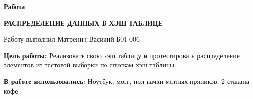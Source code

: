 

\shiftedText{0.5cm}{14cm}
{

    \begin{center}
    \vspace*{1.0cm}    
        
        {\bf\huge Работа \labnum }
        
    \vspace*{0.4cm}    
        
        {\bf\Large РАСПРЕДЕЛЕНИЕ ДАННЫХ В ХЭШ ТАБЛИЦЕ }
        
    \vspace*{0.8cm}
        
        {\Large Работу выполнил Матренин Василий Б01-006 }
        
    \vspace*{1.6cm}
    \end{center}
    
    {\bf\noindent Цель работы: }Реализовать свою хэш таблицу и протестировать распределение элементов из тестовой выборки по спискам хэш таблицы
    
    \vspace*{0.6cm}
    
    {\bf\noindent В работе использовались: }Ноутбук, мозг, пол пачки мятных пряников, 2 стакана кофе 
    
}

\newpage
